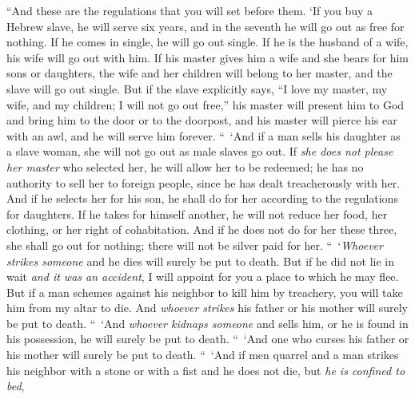 \begin{biblechapter} %
 “And these are the regulations that you will set before them.
\verse ‘If you buy a Hebrew slave, he will serve six years, and in the seventh he will go out as free for nothing.
\verse If he comes in single, he will go out single. If he is the husband of a wife, his wife will go out with him.
\verse If his master gives him a wife and she bears for him sons or daughters, the wife and her children will belong to her master, and the slave will go out single.
\verse But if the slave explicitly says, “I love my master, my wife, and my children; I will not go out free,”
\verse his master will present him to God and bring him to the door or to the doorpost, and his master will pierce his ear with an awl, and he will serve him forever.
\verse “ ‘And if a man sells his daughter as a slave woman, she will not go out as male slaves go out.
\verse If \textit{she does not please her master} who selected her, he will allow her to be redeemed; he has no authority to sell her to foreign people, since he has dealt treacherously with her.
\verse And if he selects her for his son, he shall do for her according to the regulations for daughters.
\verse If he takes for himself another, he will not reduce her food, her clothing, or her right of cohabitation.
\verse And if he does not do for her these three, she shall go out for nothing; there will not be silver paid for her.
 “ ‘\textit{Whoever strikes someone} and he dies will surely be put to death.
\verse But if he did not lie in wait \textit{and it was an accident}, I will appoint for you a place to which he may flee.
\verse But if a man schemes against his neighbor to kill him by treachery, you will take him from my altar to die.
\verse And \textit{whoever strikes} his father or his mother will surely be put to death.
\verse “ ‘And \textit{whoever kidnaps someone} and sells him, or he is found in his possession, he will surely be put to death.
\verse “ ‘And one who curses his father or his mother will surely be put to death.
\verse “ ‘And if men quarrel and a man strikes his neighbor with a stone or with a fist and he does not die, but \textit{he is confined to bed},

\end{biblechapter}
